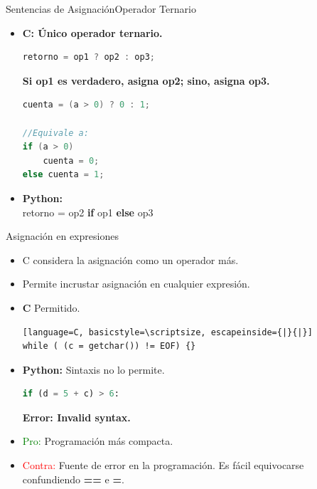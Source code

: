 \documentclass{beamer}
\begin{document}
\begin{frame}[fragile]{Sentencias de Asignación}{Operador Ternario}
\small
\begin{itemize}
	\item \textbf{C: Único operador ternario.}
	\begin{lstlisting}[language=C, basicstyle=\scriptsize] 
retorno = op1 ? op2 : op3;  
	\end{lstlisting}
	{\scriptsize \textbf{Si op1 es verdadero, asigna op2; sino, asigna op3.}}\\
	\begin{exampleblock}{}
	\begin{lstlisting}[language=C, basicstyle=\scriptsize] 
cuenta = (a > 0) ? 0 : 1;

//Equivale a:
if (a > 0)
	cuenta = 0;
else cuenta = 1;
	\end{lstlisting}\end{exampleblock}
		\item \textbf{Python:}\\
	retorno = op2 \textbf{if} op1 \textbf{else} op3\\
\end{itemize}
\end{frame}

\begin{frame}[fragile]{Asignación en expresiones}
\begin{itemize}
	\item C considera la asignación como un operador más.
	\item Permite incrustar asignación en cualquier expresión.
	\item \textbf{C} Permitido.
 	\begin{lstlisting}[language=C, basicstyle=\scriptsize, escapeinside={|}{|}] 
while ( (c = getchar()) != EOF) {}
	\end{lstlisting}
	\item \textbf{Python:} Sintaxis no lo permite.
	\begin{lstlisting}[language=Python, basicstyle=\scriptsize]
if (d = 5 + c) > 6:
	\end{lstlisting}
	\textbf{Error: Invalid syntax.}
	\item \textcolor{green}{Pro:} Programación más compacta.
	\item \textcolor{red}{Contra:} Fuente de error en la programación. Es fácil equivocarse confundiendo \textbf{==} e \textbf{=}.
\end{itemize}
\end{frame}
\end{document}
